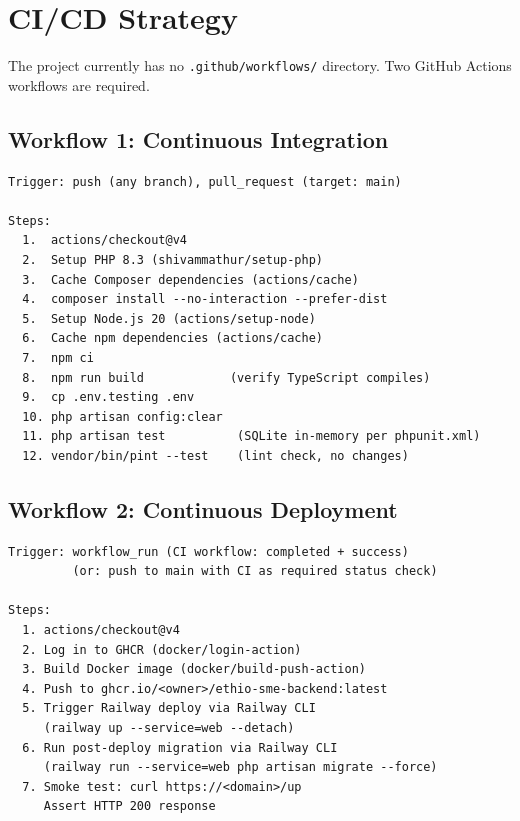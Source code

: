 \documentclass[12pt,a4paper]{report}
\begin{document}
\chapter{CI/CD Strategy}
\label{ch:cicd}

The project currently has no \texttt{.github/workflows/} directory.
Two GitHub Actions workflows are required.

\section{Workflow 1: Continuous Integration}

\begin{lstlisting}[caption={CI workflow (every push and pull request to main)}]
Trigger: push (any branch), pull_request (target: main)

Steps:
  1.  actions/checkout@v4
  2.  Setup PHP 8.3 (shivammathur/setup-php)
  3.  Cache Composer dependencies (actions/cache)
  4.  composer install --no-interaction --prefer-dist
  5.  Setup Node.js 20 (actions/setup-node)
  6.  Cache npm dependencies (actions/cache)
  7.  npm ci
  8.  npm run build            (verify TypeScript compiles)
  9.  cp .env.testing .env
  10. php artisan config:clear
  11. php artisan test          (SQLite in-memory per phpunit.xml)
  12. vendor/bin/pint --test    (lint check, no changes)
\end{lstlisting}

\section{Workflow 2: Continuous Deployment}

\begin{lstlisting}[caption={Deploy workflow (push to main only, after CI passes)}]
Trigger: workflow_run (CI workflow: completed + success)
         (or: push to main with CI as required status check)

Steps:
  1. actions/checkout@v4
  2. Log in to GHCR (docker/login-action)
  3. Build Docker image (docker/build-push-action)
  4. Push to ghcr.io/<owner>/ethio-sme-backend:latest
  5. Trigger Railway deploy via Railway CLI
     (railway up --service=web --detach)
  6. Run post-deploy migration via Railway CLI
     (railway run --service=web php artisan migrate --force)
  7. Smoke test: curl https://<domain>/up
     Assert HTTP 200 response
\end{lstlisting}
\end{document}
